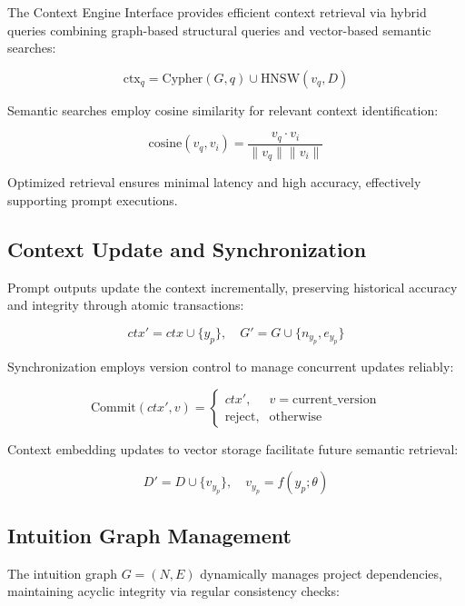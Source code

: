 \documentclass[11pt,a4paper]{article}
\begin{document}
The Context Engine Interface provides efficient context retrieval via hybrid queries combining graph-based structural queries and vector-based semantic searches:

\[
\text{ctx}_q = \text{Cypher}(G, q) \cup \text{HNSW}(v_q, D)
\]

Semantic searches employ cosine similarity for relevant context identification:

\[
\text{cosine}(v_q, v_i)=\frac{v_q\cdot v_i}{\|v_q\|\|v_i\|}
\]

Optimized retrieval ensures minimal latency and high accuracy, effectively supporting prompt executions.

\subsection{Context Update and Synchronization}
\label{subsec:context_update}

Prompt outputs update the context incrementally, preserving historical accuracy and integrity through atomic transactions:

\[
ctx'=ctx\cup\{y_p\},\quad G'=G\cup\{n_{y_p}, e_{y_p}\}
\]

Synchronization employs version control to manage concurrent updates reliably:

\[
\text{Commit}(ctx', v)=
\begin{cases}
    ctx', & v=\text{current\_version}\\[4pt]
    \text{reject}, & \text{otherwise}
\end{cases}
\]

Context embedding updates to vector storage facilitate future semantic retrieval:

\[
D'=D\cup\{v_{y_p}\},\quad v_{y_p}=f(y_p;\theta)
\]

\subsection{Intuition Graph Management}
\label{subsec:intuition_graph}

The intuition graph \(G=(N,E)\) dynamically manages project dependencies, maintaining acyclic integrity via regular consistency checks:
\end{document}
